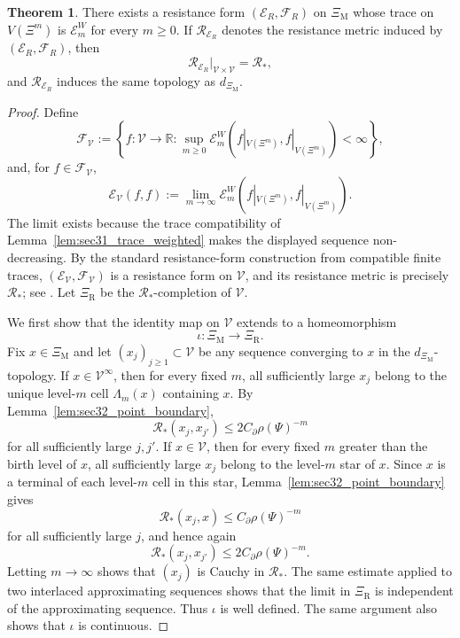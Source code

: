 \documentclass{article}
\theoremstyle{plain}
\theoremstyle{definition}
\newtheorem{theorem}{Theorem}[section]
\newcommand{\Reff}{\mathscr{R}}
\begin{document}
\begin{theorem}\label{thm:sec32_resistance_metric}
There exists a resistance form $(\mathcal E_R,\mathcal F_R)$ on $\Xi_{\mathrm M}$ whose trace on $V(\Xi^m)$ is $\mathcal E_m^W$ for every $m\ge 0$.
If $\Reff_{\mathcal E_R}$ denotes the resistance metric induced by $(\mathcal E_R,\mathcal F_R)$, then
\[
\Reff_{\mathcal E_R}|_{\mathscr V\times\mathscr V}=\Reff_*,
\]
and $\Reff_{\mathcal E_R}$ induces the same topology as $d_{\Xi_{\mathrm M}}$.
\end{theorem}

\begin{proof}
Define
\[
\mathcal F_{\mathscr V}:=
\left\{
 f:\mathscr V\to\mathbb R:
 \sup_{m\ge 0}\mathcal E_m^W(f|_{V(\Xi^m)},f|_{V(\Xi^m)})<\infty
\right\},
\]
and, for $f\in\mathcal F_{\mathscr V}$,
\[
\mathcal E_{\mathscr V}(f,f):=
\lim_{m\to\infty}
\mathcal E_m^W(f|_{V(\Xi^m)},f|_{V(\Xi^m)}).
\]
The limit exists because the trace compatibility of Lemma~\ref{lem:sec31_trace_weighted} makes the displayed sequence non-decreasing.
By the standard resistance-form construction from compatible finite traces, $(\mathcal E_{\mathscr V},\mathcal F_{\mathscr V})$ is a resistance form on $\mathscr V$, and its resistance metric is precisely $\Reff_*$; see \cite{kigami2001analysis}.
Let $\Xi_{\mathrm R}$ be the $\Reff_*$-completion of $\mathscr V$.

We first show that the identity map on $\mathscr V$ extends to a homeomorphism
\[
\iota:\Xi_{\mathrm M}\longrightarrow \Xi_{\mathrm R}.
\]
Fix $x\in\Xi_{\mathrm M}$ and let $(x_j)_{j\ge 1}\subset\mathscr V$ be any sequence converging to $x$ in the $d_{\Xi_{\mathrm M}}$-topology.
If $x\in\mathscr V^\infty$, then for every fixed $m$, all sufficiently large $x_j$ belong to the unique level-$m$ cell $\Lambda_m(x)$ containing $x$.
By Lemma~\ref{lem:sec32_point_boundary},
\[
\Reff_*(x_j,x_{j'})\le 2C_\partial\rho(\Psi)^{-m}
\]
for all sufficiently large $j,j'$.
If $x\in\mathscr V$, then for every fixed $m$ greater than the birth level of $x$, all sufficiently large $x_j$ belong to the level-$m$ star of $x$.
Since $x$ is a terminal of each level-$m$ cell in this star, Lemma~\ref{lem:sec32_point_boundary} gives
\[
\Reff_*(x_j,x)\le C_\partial\rho(\Psi)^{-m}
\]
for all sufficiently large $j$, and hence again
\[
\Reff_*(x_j,x_{j'})\le 2C_\partial\rho(\Psi)^{-m}.
\]
Letting $m\to\infty$ shows that $(x_j)$ is Cauchy in $\Reff_*$.
The same estimate applied to two interlaced approximating sequences shows that the limit in $\Xi_{\mathrm R}$ is independent of the approximating sequence.
Thus $\iota$ is well defined.
The same argument also shows that $\iota$ is continuous.


\end{proof}
\end{document}
